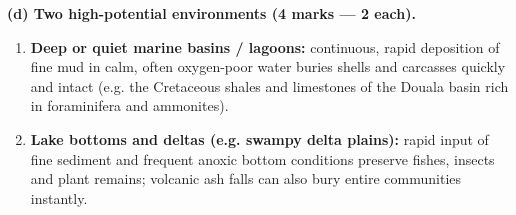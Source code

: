 \documentclass[11pt]{article}
\begin{document}
\begin{corrige}
\textbf{(d) Two high-potential environments (4 marks — 2 each).}
\begin{enumerate}
\item \textbf{Deep or quiet marine basins / lagoons:} continuous, rapid deposition of fine mud in calm, often oxygen-poor water buries shells and carcasses quickly and intact (e.g. the Cretaceous shales and limestones of the Douala basin rich in foraminifera and ammonites).
\item \textbf{Lake bottoms and deltas (e.g. swampy delta plains):} rapid input of fine sediment and frequent anoxic bottom conditions preserve fishes, insects and plant remains; volcanic ash falls can also bury entire communities instantly.
\end{enumerate}
\end{corrige}
\end{document}
